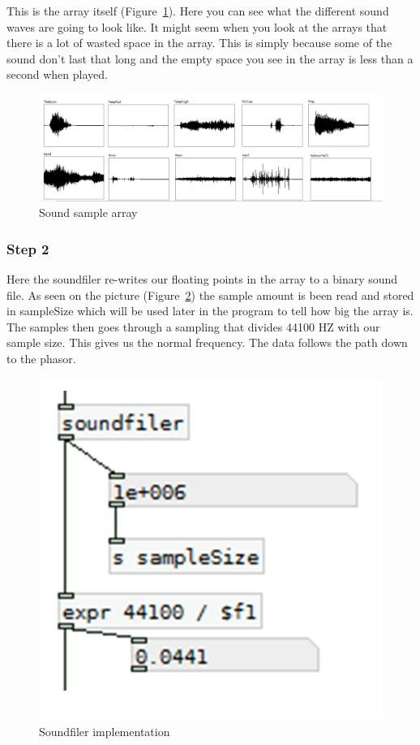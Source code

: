 This is the array itself (Figure~\ref{fig:implementation3}). 
Here you can see what the different sound waves are going to look like. 
It might seem when you look at the arrays that there is a lot of wasted space in the array. 
This is simply because some of the sound don’t last that long and the empty space you see in the array is less than a second when played.

\begin{figure}[!htbp]
    \centering
    \includegraphics[width=.5\textwidth]{images/Implementation3.png}
    \caption{Sound sample array}
    \label{fig:implementation3}
\end{figure}


\FloatBarrier
\subsubsection*{Step 2} %
\label{ssub:step_2}

Here the soundfiler re-writes our floating points in the array to a binary sound file. 
As seen on the picture (Figure~\ref{fig:implementation4}) the sample amount is been read and stored in sampleSize which will be used later in the program to tell how big the array is. 
The samples then goes through a sampling that divides 44100 HZ with our sample size. This gives us the normal frequency. The data follows the path down to the phasor.

\begin{figure}[!htbp]
    \centering
    \includegraphics[width=.3\textwidth]{images/Implementation4.png}
    \caption{Soundfiler implementation}
    \label{fig:implementation4}
\end{figure}


\FloatBarrier
